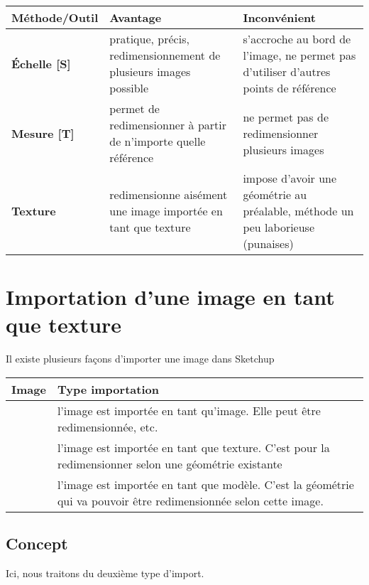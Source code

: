 \documentclass[a4paper,12pt,french]{sphinxmanual}
\begin{document}
\noindent\begin{tabulary}{\linewidth}{|L|L|L|}
\hline

\textbf{Méthode/Outil}
&
\textbf{Avantage}
&
\textbf{Inconvénient}
\\
\hline
\textbf{Échelle {[}S{]}}
&
pratique, précis, redimensionnement de plusieurs images possible
&
s'accroche au bord de l'image, ne permet pas d'utiliser d'autres points de référence
\\
\hline
\textbf{Mesure {[}T{]}}
&
permet de redimensionner à partir de n'importe quelle référence
&
ne permet pas de redimensionner plusieurs images
\\
\hline
\textbf{Texture}
&
redimensionne aisément une image importée en tant que texture
&
impose d'avoir une géométrie au préalable, méthode un peu laborieuse (punaises)
\\
\hline\end{tabulary}



\section{Importation d'une image en tant que texture}
\label{su/import-img-com-texture:image-com-txtur}\label{su/import-img-com-texture:importation-d-une-image-en-tant-que-texture}\label{su/import-img-com-texture::doc}
Il existe plusieurs façons d'importer une image dans Sketchup

\noindent\begin{tabulary}{\linewidth}{|L|L|}
\hline

\textbf{Image}
&
\textbf{Type importation}
\\
\hline
{}
&
l'image est importée en tant qu'image. Elle peut être redimensionnée, etc.
\\
\hline
{}
&
l'image est importée en tant que texture. C'est pour la redimensionner selon une géométrie existante
\\
\hline
{}
&
l'image est importée en tant que modèle. C'est la géométrie qui va pouvoir être redimensionnée selon cette image.
\\
\hline\end{tabulary}



\subsection{Concept}
\label{su/import-img-com-texture:concept}
Ici, nous traitons du deuxième type d'import.
\end{document}
